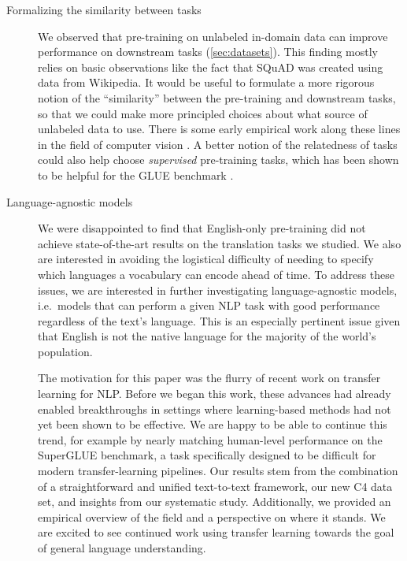 \begin{description}
\item[Formalizing the similarity between tasks] We observed that pre-training on unlabeled in-domain data can improve performance on downstream tasks (\ref{sec:datasets}).
This finding mostly relies on basic observations like the fact that SQuAD was created using data from Wikipedia. It would be useful to formulate a more rigorous notion of the ``similarity'' between the pre-training and downstream tasks, so that we could make more principled choices about what source of unlabeled data to use. There is some early empirical work along these lines in the field of computer vision \citep{huh2016makes,kornblith2018better,he2018rethinking}. A better notion of the relatedness of tasks could also help choose \textit{supervised} pre-training tasks, which has been shown to be helpful for the GLUE benchmark \citep{phang2018sentence}.

\item[Language-agnostic models] We were disappointed to find that English-only pre-training did not achieve state-of-the-art results on the translation tasks we studied. We also are interested in avoiding the logistical difficulty of needing to specify which languages a vocabulary can encode ahead of time. To address these issues, we are interested in further investigating language-agnostic models, i.e.\ models that can perform a given NLP task with good performance regardless of the text's language. This is an especially pertinent issue given that English is not the native language for the majority of the world's population.

The motivation for this paper was the flurry of recent work on transfer learning for NLP. Before we began this work, these advances had already enabled breakthroughs in settings where learning-based methods had not yet been shown to be effective. We are happy to be able to continue this trend, for example by nearly matching human-level performance on the SuperGLUE benchmark, a task specifically designed to be difficult for modern transfer-learning pipelines. Our results stem from the combination of a straightforward and unified text-to-text framework, our new C4 data set, and insights from our systematic study. Additionally, we provided an empirical overview of the field and a perspective on where it stands. We are excited to see continued work using transfer learning towards the goal of general language understanding.

\end{description}

